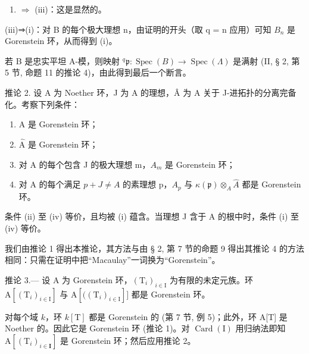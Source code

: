 \begin{enumerate}
\def\labelenumi{(\roman{enumi})}
\setcounter{enumi}{1}
\tightlist
\item
  \(\Rightarrow\) (iii)：这是显然的。
\end{enumerate}

(iii)⇒(i)：对 B 的每个极大理想 n，由证明的开头（取 q = n 应用）可知 \(B_{n}\) 是 Gorenstein 环，从而得到 (i)。

若 B 是忠实平坦 A-模，则映射 \(^{q}\mathfrak{p}:\operatorname{Spec}(B)\longrightarrow\operatorname{Spec}(\Lambda)\) 是满射 (II, § 2, 第 5 节, 命题 11 的推论 4)，由此得到最后一个断言。

推论 2. 设 A 为 Noether 环，J 为 A 的理想，Â 为 A 关于 J-进拓扑的分离完备化。考察下列条件：

\begin{enumerate}
\def\labelenumi{(\roman{enumi})}
\item
  A 是 Gorenstein 环；
\item
  \(\widehat{\mathrm{A}}\) 是 Gorenstein 环；
\item
  对 A 的每个包含 J 的极大理想 m，\(A_{m}\) 是 Gorenstein 环；
\item
  对 A 的每个满足 \(p + J \neq A\) 的素理想 p，\(A_{p}\) 与 \(\kappa(\mathfrak{p}) \otimes_{A} \widehat{A}\) 都是 Gorenstein 环。
\end{enumerate}

条件 (ii) 至 (iv) 等价，且均被 (i) 蕴含。当理想 J 含于 A 的根中时，条件 (i) 至 (iv) 等价。

我们由推论 1 得出本推论，其方法与由 § 2, 第 7 节的命题 9 得出其推论 4 的方法相同：只需在证明中把“Macaulay”一词换为“Gorenstein”。

推论 3.--- 设 A 为 Gorenstein 环，\((\mathrm{T}_{i})_{i\in\mathrm{I}}\) 为有限的未定元族。环 \(\mathrm{A}[(\mathrm{T}_{i})_{i\in\mathrm{I}}]\) 与 \(\mathrm{A}[((\mathrm{T}_{i})_{i\in\mathrm{I}}]]\) 都是 Gorenstein 环。

对每个域 \(k\)，环 \(k[\mathrm{T}]\) 都是 Gorenstein 的 (第 7 节, 例 5)；此外，环 A{[}T{]} 是 Noether 的。因此它是 Gorenstein 环 (推论 1)。对 \(\operatorname{Card}(\mathrm{I})\) 用归纳法即知 \(\mathrm{A}[(\mathrm{T}_i)_{i\in \mathbf{I}}]\) 是 Gorenstein 环；然后应用推论 2。


